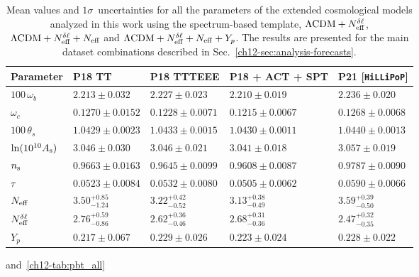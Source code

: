 \begin{subappendices}
\begin{table}
\begin{subtable}{\textwidth}
		
		\begin{tabular}{l l l l l}
				\toprule
			Parameter			& P18 TT					& P18 TTTEEE				& P18 + ACT + SPT			& P21 [\texttt{HiLLiPoP}]	\\
				\midrule[0.065em]
			$100\,\omega_b$		& $2.213 \pm 0.032$			& $2.227 \pm 0.023$			& $2.210 \pm 0.019$			& $2.236 \pm 0.020$			\\
			$\omega_c$			& $0.1270 \pm 0.0152$		& $0.1228 \pm 0.0071$		& $0.1215 \pm 0.0067$		& $0.1268 \pm 0.0068$		\\
			$100\,\theta_s$		& $1.0429 \pm 0.0023$		& $1.0433 \pm 0.0015$		& $1.0430 \pm 0.0011$		& $1.0440 \pm 0.0013$		\\
			$\ln(10^{10}A_\mathrm{s})$	& $3.046 \pm 0.030$			& $3.046 \pm 0.021$			& $3.041 \pm 0.018$			& $3.057 \pm 0.019$			\\
			$n_\mathrm{s}$				& $0.9663 \pm 0.0163$		& $0.9645 \pm 0.0099$		& $0.9608 \pm 0.0087$		& $0.9787 \pm 0.0090$		\\
			$\tau$				& $0.0523 \pm 0.0084$		& $0.0532 \pm 0.0080$		& $0.0505 \pm 0.0062$		& $0.0590 \pm 0.0066$		\\
			$N_\mathrm{eff}$				& $3.50^{+0.85}_{-1.24}$	& $3.22^{+0.42}_{-0.52}$	& $3.13^{+0.38}_{-0.49}$	& $3.59^{+0.39}_{-0.50}$	\\
			$N_\mathrm{eff}^{\delta\ell}$		& $2.76^{+0.59}_{-0.86}$	& $2.62^{+0.36}_{-0.46}$	& $2.68^{+0.31}_{-0.36}$	& $2.47^{+0.32}_{-0.35}$	\\
			$Y_p$				& $0.217 \pm 0.067$			& $0.229 \pm 0.026$			& $0.223 \pm 0.024$			& $0.228 \pm 0.022$			\\
				\bottomrule
		\end{tabular}
	
		\caption[Complete spectrum-based constraints on all cosmological parameters]{$\Lambda\mathrm{CDM} + \Nmultipole + \Neff + Y_p$}
\end{subtable}
	\caption[Complete spectrum-based constraints on all cosmological parameters]{Mean values and $1\sigma$~uncertainties for all the parameters of the extended cosmological models analyzed in this work using the spectrum-based template, $\Lambda\mathrm{CDM} + N_\mathrm{eff}^{\delta\ell}$, $\Lambda\mathrm{CDM} + N_\mathrm{eff}^{\delta\ell} + N_\mathrm{eff}$ and $\Lambda\mathrm{CDM} + \Nmultipole + \Neff + Y_p$. The results are presented for the main dataset combinations described in Sec.~\ref{ch12-sec:analysis-forecasts}.}
	\label{ch12-tab:sbt_all}
\end{table}
and~\ref{ch12-tab:pbt_all}
\begin{table}
	\centering\small\setlength{\tabcolsep}{5pt}
	\begin{subtable}{\textwidth}
		\centering



\end{subtable}
\end{table}
\end{subappendices}

